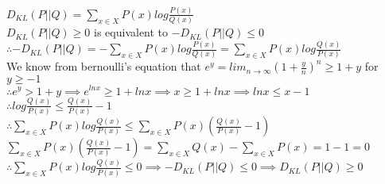 \begin{answer}\\
$D_{KL}(P||Q)=\sum_{x \in X}P(x) log \frac{P(x)}{Q(x)}$\\
$D_{KL}(P||Q) \geq 0$ is equivalent to $-D_{KL}(P||Q) \leq 0$\\
$\therefore -D_{KL}(P||Q)=-\sum_{x \in X}P(x) log \frac{P(x)}{Q(x)}=\sum_{x \in X}P(x) log \frac{Q(x)}{P(x)}$\\
We know from bernoulli's equation that $e^y=lim_{n \rightarrow \infty}(1+\frac{y}{n})^n \geq 1+y$ for $y \geq -1$\\
$\therefore e^y>1+y \implies e^{ln x}\geq 1+lnx \implies x \geq 1+lnx \implies lnx \leq x-1$\\
$\therefore log \frac{Q(x)}{P(x)} \leq \frac{Q(x)}{P(x)}-1$\\
$\therefore \sum_{x \in X}P(x) log \frac{Q(x)}{P(x)} \leq \sum_{x \in X}P(x) (\frac{Q(x)}{P(x)}-1)$\\
$\sum_{x \in X}P(x) (\frac{Q(x)}{P(x)}-1)=\sum_{x \in X}Q(x)-\sum_{x \in X}P(x)=1-1=0$\\
$\therefore \sum_{x \in X}P(x) log \frac{Q(x)}{P(x)} \leq 0 \implies -D_{KL}(P||Q) \leq 0 \implies D_{KL}(P||Q) \geq 0$\\
\end{answer}
